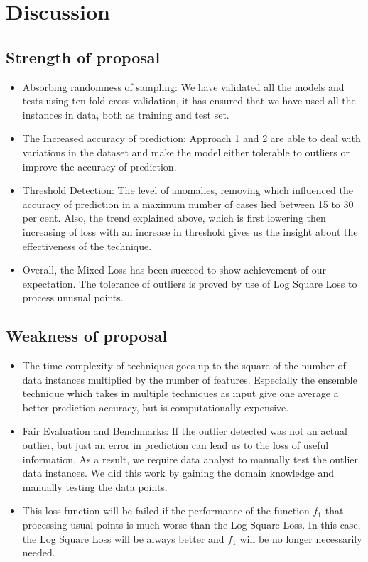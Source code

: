 \documentclass[runningheads]{llncs}
\begin{document}
\section{Discussion}
\subsection{Strength of proposal}
\begin{itemize}
    \item Absorbing randomness of sampling: We have validated all the models and tests using ten-fold cross-validation, it has ensured that we have used all the instances in data, both as training and test set.
    \item The Increased accuracy of prediction:
    Approach 1 and 2 are able to deal with variations in the dataset and make the model either tolerable to outliers or improve the accuracy of prediction.
    \item Threshold Detection: The level of anomalies, removing which influenced the accuracy of prediction in a maximum number of cases lied between 15 to 30 per cent. Also, the trend explained above, which is first lowering then increasing of loss with an increase in threshold gives us the insight about the effectiveness of the technique.
    \item Overall, the Mixed Loss has been succeed to show achievement of our expectation. The tolerance of outliers is proved by use of Log Square Loss to process unusual points.
\end{itemize}


\subsection{Weakness of proposal}
\begin{itemize}
    \item The time complexity of techniques goes up to the square of the number of data instances multiplied by the number of features. Especially the ensemble technique which takes in multiple techniques as input give one average a better prediction accuracy, but is computationally expensive.
    \item Fair Evaluation and Benchmarks: If the outlier detected was not an actual outlier, but just an error in prediction can lead us to the loss of useful information. As a result, we require data analyst to manually test the outlier data instances. We did this work by gaining the domain knowledge and manually testing the data points.
    \item This loss function will be failed if the performance of the function $f_1$ that processing usual points is much worse than the Log Square Loss. In this case, the Log Square Loss will be always better and $f_1$ will be no longer necessarily needed. 
\end{itemize}
\end{document}
